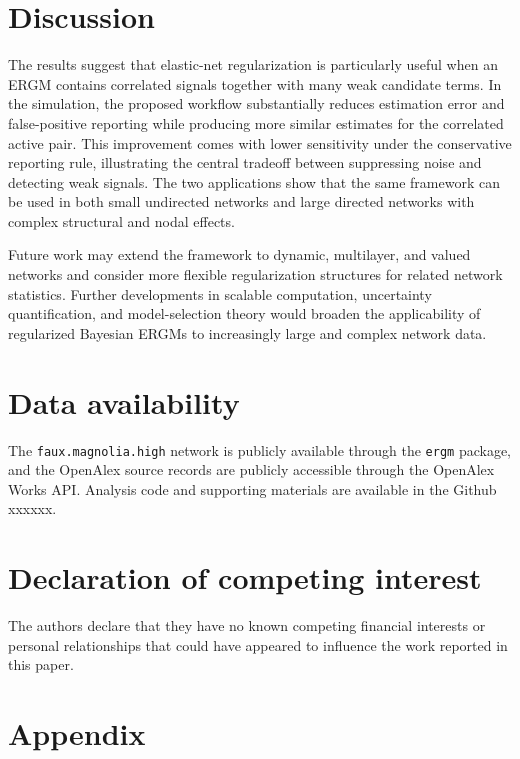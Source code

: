 \documentclass[preprint,12pt,authoryear]{elsarticle}
\begin{document}
\section{Discussion}
\label{sec:discussion}

The results suggest that elastic-net regularization is particularly useful when an ERGM contains correlated signals together with many weak candidate terms. In the simulation, the proposed workflow substantially reduces estimation error and false-positive reporting while producing more similar estimates for the correlated active pair. This improvement comes with lower sensitivity under the conservative reporting rule, illustrating the central tradeoff
between suppressing noise and detecting weak signals. The two applications show that the same framework can be used in both small undirected networks and large directed networks with complex structural and nodal effects.

Future work may extend the framework to dynamic, multilayer, and valued networks and consider more flexible regularization structures for related network statistics. Further developments in scalable computation, uncertainty quantification, and model-selection theory would broaden the applicability of regularized Bayesian ERGMs to increasingly large and complex network data.

\section*{Data availability}

The \texttt{faux.magnolia.high} network is publicly available
through the \texttt{ergm} package, and the OpenAlex source records are publicly accessible through the OpenAlex Works API.  Analysis code and supporting materials are available in the Github xxxxxx.

\section*{Declaration of competing interest}

The authors declare that they have no known competing financial interests or personal relationships that could have appeared to influence the work reported in this paper.




\section{Appendix}
\end{document}
